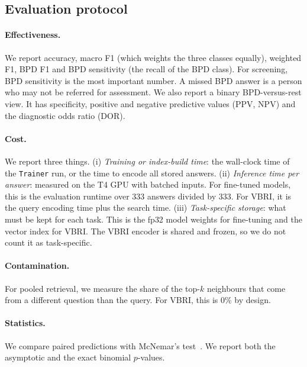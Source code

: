 \documentclass[11pt]{article}
\newcommand{\vbri}{VBRI}
\begin{document}
\subsection{Evaluation protocol}

\paragraph{Effectiveness.} We report accuracy, macro F1 (which weights the three classes equally),
weighted F1, BPD F1 and BPD sensitivity (the recall of the BPD class). For screening, BPD
sensitivity is the most important number. A missed BPD answer is a person who may not be referred
for assessment. We also report a binary BPD-versus-rest view. It has specificity, positive and
negative predictive values (PPV, NPV) and the diagnostic odds ratio (DOR).

\paragraph{Cost.} We report three things. (i) \emph{Training or index-build time}: the wall-clock
time of the \texttt{Trainer} run, or the time to encode all stored answers. (ii) \emph{Inference
time per answer}: measured on the T4 GPU with batched inputs. For fine-tuned models, this is the
evaluation runtime over 333 answers divided by 333. For \vbri{}, it is the query encoding time plus
the search time. (iii) \emph{Task-specific storage}: what must be kept for each task. This is the
fp32 model weights for fine-tuning and the vector index for \vbri{}. The \vbri{} encoder is shared
and frozen, so we do not count it as task-specific.

\paragraph{Contamination.} For pooled retrieval, we measure the share of the top-$k$ neighbours that
come from a different question than the query. For \vbri{}, this is 0\% by design.

\paragraph{Statistics.} We compare paired predictions with McNemar's test~\cite{mcnemar1947}. We
report both the asymptotic and the exact binomial $p$-values.

\end{document}
